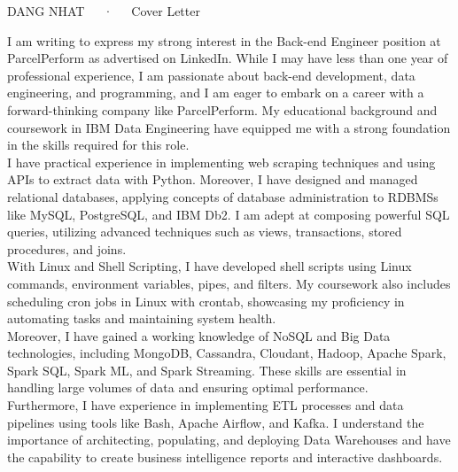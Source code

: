 \documentclass[11pt, a4paper]{awesome-cv}
\begin{document}
\makecvheader[R]

\makecvfooter
  {DANG NHAT~~~·~~~Cover Letter}
  {}

\makelettertitle

\begin{cvletter}
I am writing to express my strong interest in the Back-end Engineer position at ParcelPerform as advertised on LinkedIn. While I may have less than one year of professional experience, I am passionate about back-end development, data engineering, and programming, and I am eager to embark on a career with a forward-thinking company like ParcelPerform. My educational background and coursework in IBM Data Engineering have equipped me with a strong foundation in the skills required for this role.
\\I have practical experience in implementing web scraping techniques and using APIs to extract data with Python. Moreover, I have designed and managed relational databases, applying concepts of database administration to RDBMSs like MySQL, PostgreSQL, and IBM Db2. I am adept at composing powerful SQL queries, utilizing advanced techniques such as views, transactions, stored procedures, and joins.
\\With Linux and Shell Scripting, I have developed shell scripts using Linux commands, environment variables, pipes, and filters. My coursework also includes scheduling cron jobs in Linux with crontab, showcasing my proficiency in automating tasks and maintaining system health.
\\Moreover, I have gained a working knowledge of NoSQL and Big Data technologies, including MongoDB, Cassandra, Cloudant, Hadoop, Apache Spark, Spark SQL, Spark ML, and Spark Streaming. These skills are essential in handling large volumes of data and ensuring optimal performance.
\\Furthermore, I have experience in implementing ETL processes and data pipelines using tools like Bash, Apache Airflow, and Kafka. I understand the importance of architecting, populating, and deploying Data Warehouses and have the capability to create business intelligence reports and interactive dashboards.

\end{cvletter}
\end{document}
